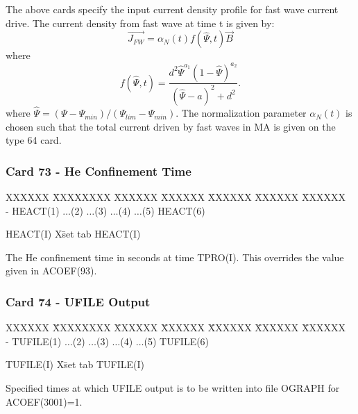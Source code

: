 The above cards specify the input current density profile for fast wave current drive.
The current density from fast wave at time t is given by:
\begin{equation}
\vec{J_{FW}}= {\alpha}_{N}(t)f(\hat{\Psi},t)\vec{B}
\end{equation}
where
\begin{equation}
f(\hat{\Psi},t) = \frac{d^2 \hat{\Psi}^{a_{1}}(1-\hat{\Psi})^{a_{2}}}{(\hat{\Psi}-a)^2+d^2} .
\end{equation}
where $\hat{\Psi}=( \Psi - {\Psi}_{min}) / ({\Psi}_{lim}-{\Psi}_{min})$.  The normalization parameter
${\alpha}_N(t)$ is chosen such that the total current driven by fast waves in MA is given on the type 64 card.
\newpage \subsubsection{Card 73 - He Confinement Time}
\begin{tabbing}
XXXXXX \= XXXXXXXX \= XXXXXX \= XXXXXX \= XXXXXX \= XXXXXX \=
XXXXXX       \\
\footnotesize - \>\footnotesize  HEACT(1) \>\footnotesize $\ldots$(2) \>\footnotesize
$\ldots$(3) \>\footnotesize $\ldots$(4) \>\footnotesize $\ldots$(5) \>\footnotesize HEACT(6)
\\
\end{tabbing}
\begin{tabbing}
HEACT(I) X\= set tab \kill
HEACT(I) \> \parbox[t]{\width}{The He confinement time in seconds
at time TPRO(I).  This overrides the value given in ACOEF(93).}
\end{tabbing}
\newpage \subsubsection{Card 74 - UFILE Output}
\begin{tabbing}
XXXXXX \= XXXXXXXX \= XXXXXX \= XXXXXX \= XXXXXX \= XXXXXX \=
XXXXXX       \\
\footnotesize - \>\footnotesize  TUFILE(1) \>\footnotesize $\ldots$(2) \>\footnotesize
$\ldots$(3) \>\footnotesize $\ldots$(4) \>\footnotesize $\ldots$(5) \>\footnotesize TUFILE(6)
\\
\end{tabbing}
\begin{tabbing}
TUFILE(I) X\= set tab \kill
TUFILE(I) \> \parbox[t]{\width}{Specified times at which UFILE output
is to be written into file OGRAPH for ACOEF(3001)=1.}
\end{tabbing}
